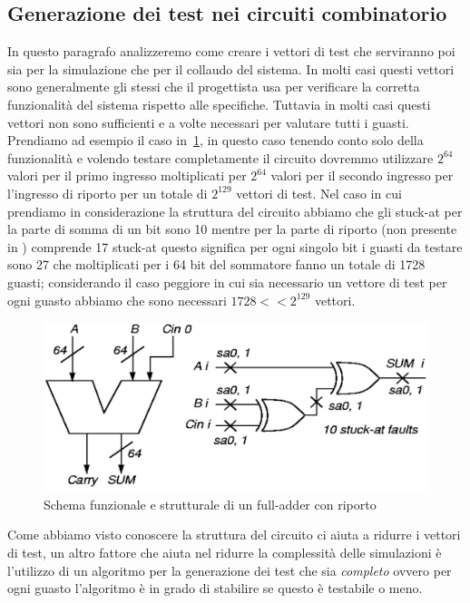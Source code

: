 \subsection{Generazione dei test nei circuiti combinatorio}
In questo paragrafo analizzeremo come creare i vettori di test che serviranno poi sia per la simulazione che per il collaudo del sistema.
In molti casi questi vettori sono generalmente gli stessi che il progettista usa per verificare la corretta funzionalità del sistema rispetto alle specifiche. Tuttavia in molti casi questi vettori non sono sufficienti e a volte necessari per valutare tutti i guasti. 
Prendiamo ad esempio il caso in \figurename\,\ref{fig:fulladder}, in questo caso tenendo conto solo della funzionalità e volendo testare completamente il circuito dovremmo utilizzare $2^{64}$ valori per il primo ingresso moltiplicati per $2^{64}$ valori per il secondo ingresso per l'ingresso di riporto per un totale di $2^{129}$ vettori di test. Nel caso in cui prendiamo in considerazione la struttura del circuito abbiamo che gli stuck-at per la parte di somma di un bit sono 10 mentre per la parte di riporto (non presente in \figurename) comprende 17 stuck-at questo significa per ogni singolo bit i guasti da testare sono 27 che moltiplicati per i 64 bit del sommatore fanno un totale di 1728 guasti; considerando il caso peggiore in cui sia necessario un vettore di test per ogni guasto abbiamo che sono necessari $1728 << 2^{129}$ vettori.\\
\begin{figure}
\centering
\includegraphics[scale=0.35]{img/fulladder.png}
\caption{Schema funzionale e strutturale di un full-adder con riporto}\label{fig:fulladder}
\end{figure}
Come abbiamo visto conoscere la struttura del circuito ci aiuta a ridurre i vettori di test, un altro fattore che aiuta nel ridurre la complessità delle simulazioni è l'utilizzo di un algoritmo per la generazione dei test che sia \emph{completo} ovvero per ogni guasto l'algoritmo è in grado di stabilire se questo è testabile o meno.\\
